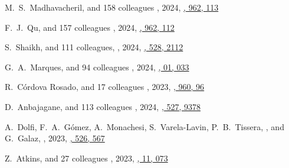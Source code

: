 \begin{etaremune}
\item
M.~S.~Madhavacheril, and 158 colleagues
,
2024, \href{https://ui.adsabs.harvard.edu/abs/2024ApJ...962..113M/abstract}{\apj, 962, 113}

\item
F.~J.~Qu, and 157 colleagues
,
2024, \href{https://ui.adsabs.harvard.edu/abs/2024ApJ...962..112Q/abstract}{\apj, 962, 112}
\item

S.~Shaikh, and 111 colleagues,
,
2024, \href{https://ui.adsabs.harvard.edu/abs/2024MNRAS.528.2112S}{\mnras, 528, 2112}

\item
G.~A.~Marques, and 94 colleagues
,
2024, \href{https://ui.adsabs.harvard.edu/abs/2024JCAP...01..033M/abstract}{\jcap, 01, 033}
   
\item
R.~Córdova Rosado, and 17 colleagues
,
2023, \href{https://ui.adsabs.harvard.edu/abs/2023arXiv230706352C}{\apj, 960, 96}

\item
D.~Anbajagane, and 113 colleagues
,
2024, \href{https://ui.adsabs.harvard.edu/abs/2023arXiv231000059A}{\mnras, 527, 9378}
 
\item
A.~Dolfi, F.~A.~Gómez, A.~Monachesi, S.~Varela-Lavin, P.~B.~Tissera, \myself, and G.~Galaz,
,
2023, \href{https://ui.adsabs.harvard.edu/abs/2023MNRAS.526..567D}{\mnras, 526, 567}

\item
Z.~Atkins, and 27 colleagues
,
2023, \href{https://ui.adsabs.harvard.edu/abs/2023JCAP...11..073A/abstract}{\jcap, 11, 073}


\end{etaremune}
